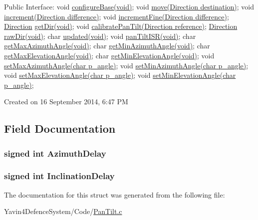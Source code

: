 Public Interface\+: void \hyperlink{PanTilt_8h_ab7b8c8f7bf051b4f8e3b151f7b567127}{configure\+Base(void)}; void \hyperlink{PanTilt_8h_a032fbfc434ca24d27d89b6d768455a42}{move(\+Direction destination)}; void \hyperlink{PanTilt_8h_af8e57fbe1513bb48274f4f0f46717fa1}{increment(\+Direction difference)}; void \hyperlink{PanTilt_8h_a5350e3f473fb25899612d382c1baa642}{increment\+Fine(\+Direction difference)}; \hyperlink{structDirection}{Direction} \hyperlink{PanTilt_8h_ad1d9638bad5a5021969d19769e70c775}{get\+Dir(void)}; void \hyperlink{PanTilt_8h_a60e08860a1b4ca9efdc2dd43983731d5}{calibrate\+Pan\+Tilt(\+Direction reference)}; \hyperlink{structDirection}{Direction} \hyperlink{PanTilt_8h_a251ee95d75c68e21c4bb933ac99e5108}{raw\+Dir(void)}; char \hyperlink{PanTilt_8h_a3362a0aacdd7037d0329989d353c60b7}{updated(void)}; void \hyperlink{PanTilt_8h_a7f353056fb02f0d95fd997198f5b186f}{pan\+Tilt\+I\+S\+R(void)}; char \hyperlink{PanTilt_8h_ae8f9ea5919de15d1b5614be2e5e65be3}{get\+Max\+Azimuth\+Angle(void)}; char \hyperlink{PanTilt_8h_af45dd498eebe7f5ba7b228c15e7221c1}{get\+Min\+Azimuth\+Angle(void)}; char \hyperlink{PanTilt_8h_a4278dbef7fe9034a7a54d02bcbb16de9}{get\+Max\+Elevation\+Angle(void)}; char \hyperlink{PanTilt_8h_af7fafa63e9c645a80f28aca253bba5cc}{get\+Min\+Elevation\+Angle(void)}; void \hyperlink{PanTilt_8h_a1f5e600a2655aeb9dd24b8325a777931}{set\+Max\+Azimuth\+Angle(char p\+\_\+angle)}; void \hyperlink{PanTilt_8h_a157ea38d68fcd31082dc2eaba2944ef3}{set\+Min\+Azimuth\+Angle(char p\+\_\+angle)}; void \hyperlink{PanTilt_8h_aa956697480994a26cb592b2cfcf3436c}{set\+Max\+Elevation\+Angle(char p\+\_\+angle)}; void \hyperlink{PanTilt_8h_a001917f3c38b200d142ab6932991e001}{set\+Min\+Elevation\+Angle(char p\+\_\+angle)};

Created on 16 September 2014, 6\+:47 P\+M 

\subsection{Field Documentation}
\hypertarget{structDelay_aacc83952fc6c5812597bc96d622f5317}{
\subsubsection[{Azimuth\+Delay}]{\setlength{\rightskip}{0pt plus 5cm}signed int Azimuth\+Delay}}\label{structDelay_aacc83952fc6c5812597bc96d622f5317}
\hypertarget{structDelay_a4f5b10a6a07a4aaed02134ab2691b8ec}{
\subsubsection[{Inclination\+Delay}]{\setlength{\rightskip}{0pt plus 5cm}signed int Inclination\+Delay}}\label{structDelay_a4f5b10a6a07a4aaed02134ab2691b8ec}


The documentation for this struct was generated from the following file\+:\begin{DoxyCompactItemize}
\item 
Yavin4\+Defence\+System/\+Code/\hyperlink{PanTilt_8c}{Pan\+Tilt.\+c}\end{DoxyCompactItemize}
